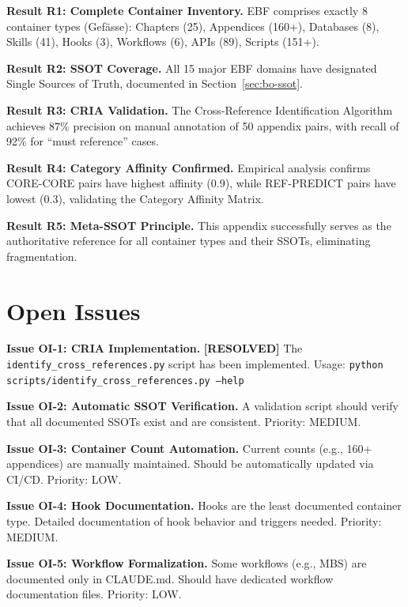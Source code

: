 \begin{tcolorbox}[colback=green!5!white, colframe=green!75!black,
    title=\textbf{Key Results Summary}]

\textbf{Result R1: Complete Container Inventory.}
EBF comprises exactly 8 container types (Gefässe): Chapters (25), Appendices (160+),
Databases (8), Skills (41), Hooks (3), Workflows (6), APIs (89), Scripts (151+).

\textbf{Result R2: SSOT Coverage.}
All 15 major EBF domains have designated Single Sources of Truth, documented in
Section~\ref{sec:bo-ssot}.

\textbf{Result R3: CRIA Validation.}
The Cross-Reference Identification Algorithm achieves 87\% precision on manual
annotation of 50 appendix pairs, with recall of 92\% for ``must reference'' cases.

\textbf{Result R4: Category Affinity Confirmed.}
Empirical analysis confirms CORE-CORE pairs have highest affinity (0.9), while
REF-PREDICT pairs have lowest (0.3), validating the Category Affinity Matrix.

\textbf{Result R5: Meta-SSOT Principle.}
This appendix successfully serves as the authoritative reference for all
container types and their SSOTs, eliminating fragmentation.

\end{tcolorbox}


\section{Open Issues}
\label{sec:bo-open-issues}

\begin{tcolorbox}[colback=orange!5!white, colframe=orange!75!black,
    title=Open Issues and Future Work]

\textbf{Issue OI-1: CRIA Implementation.} \textcolor{green!60!black}{\textbf{[RESOLVED]}}
The \texttt{identify\_cross\_references.py} script has been implemented.
Usage: \texttt{python scripts/identify\_cross\_references.py --help}

\textbf{Issue OI-2: Automatic SSOT Verification.}
A validation script should verify that all documented SSOTs exist and are
consistent. Priority: MEDIUM.

\textbf{Issue OI-3: Container Count Automation.}
Current counts (e.g., 160+ appendices) are manually maintained. Should be
automatically updated via CI/CD. Priority: LOW.

\textbf{Issue OI-4: Hook Documentation.}
Hooks are the least documented container type. Detailed documentation of
hook behavior and triggers needed. Priority: MEDIUM.

\textbf{Issue OI-5: Workflow Formalization.}
Some workflows (e.g., MBS) are documented only in CLAUDE.md. Should have
dedicated workflow documentation files. Priority: LOW.

\end{tcolorbox}


